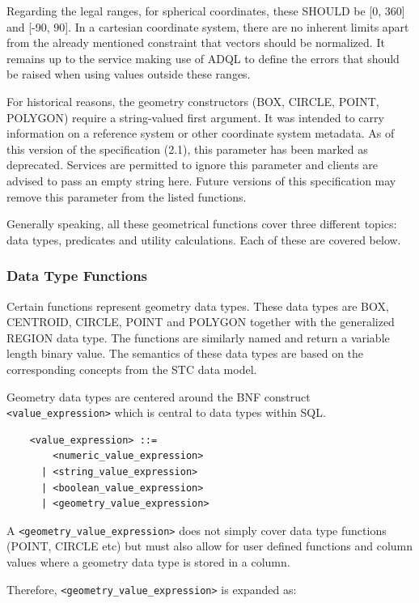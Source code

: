 \documentclass[11pt,a4paper]{ivoa}
\begin{document}
Regarding the legal ranges, for spherical coordinates, these SHOULD be [0, 360]
and [-90, 90]. In a cartesian coordinate system, there are no inherent limits
apart from the already mentioned constraint that vectors should be normalized. It remains
up to the service making use of ADQL to define the errors that should be raised
when using values outside these ranges.

For historical reasons, the geometry constructors (BOX, CIRCLE, POINT,
POLYGON) require a string-valued first argument. It was intended to carry
information on a reference system or other coordinate system metadata.
As of this version of the specification (2.1), this parameter has been
marked as deprecated. Services are permitted to ignore this parameter and
clients are advised to pass an empty string here. Future versions of this
specification may remove this parameter from the listed functions.

Generally speaking, all these geometrical functions cover three different
topics: data types, predicates and utility calculations. Each of these are
covered below.

\subsubsection{Data Type Functions}
\label{sec:geom.functions.type}

Certain functions represent geometry data types. These data types are BOX,
CENTROID, CIRCLE, POINT and POLYGON together with the generalized REGION data
type. The functions are similarly named and return a variable length binary
value. The semantics of these data types are based on the corresponding
concepts from the STC data model.

Geometry data types are centered around the BNF construct
\verb:<value_expression>: which is central to data types within SQL.

\begin{verbatim}
    <value_expression> ::=
        <numeric_value_expression>
      | <string_value_expression>
      | <boolean_value_expression>
      | <geometry_value_expression>
\end{verbatim}

A \verb:<geometry_value_expression>: does not simply cover data type functions
(POINT, CIRCLE etc) but must also allow for user defined functions and
column values where a geometry data type is stored in a column.

Therefore, \verb:<geometry_value_expression>: is expanded as:
\end{document}
